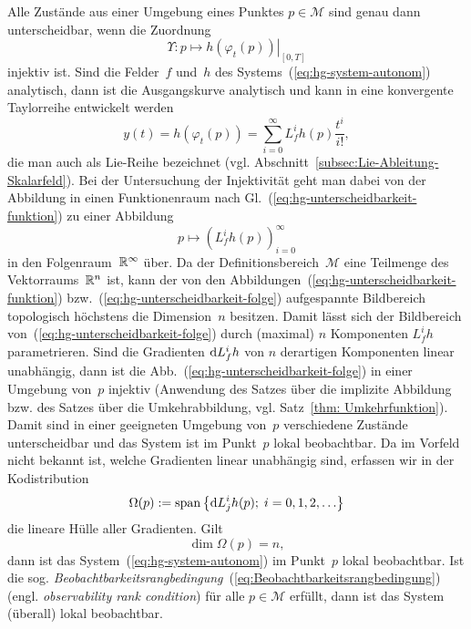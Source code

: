 Alle Zustände aus einer Umgebung eines Punktes $p\in\mathcal{M}$
sind genau dann unterscheidbar, wenn die Zuordnung 
\begin{equation}
\Upsilon:p\mapsto\left.h(\varphi_{t}(p))\right|_{[0,T]}\label{eq:hg-unterscheidbarkeit-funktion}
\end{equation}
injektiv ist. Sind die Felder~$f$ und~$h$
des Systems~(\ref{eq:hg-system-autonom}) analytisch, dann ist die
Ausgangskurve analytisch und kann in eine konvergente Taylorreihe
entwickelt werden
\[
y(t)=h(\varphi_{t}(p))=\sum_{i=0}^{\infty}L_{f}^{i}h(p)\frac{t^{i}}{i!},
\]
die man auch als Lie-Reihe bezeichnet (vgl. Abschnitt~\ref{subsec:Lie-Ableitung-Skalarfeld}).
Bei der Untersuchung der Injektivität geht man dabei von der Abbildung
in einen Funktionenraum nach Gl.~(\ref{eq:hg-unterscheidbarkeit-funktion})
zu einer Abbildung
\begin{equation}
p\mapsto\left(L_{f}^{i}h(p)\right)_{i=0}^{\infty}\label{eq:hg-unterscheidbarkeit-folge}
\end{equation}
in den Folgenraum~${\mathbb{R}}^{\infty}$ über. Da der Definitionsbereich~$\mathcal{M}$
eine Teilmenge des Vektorraums~${\mathbb{R}}^{n}$ ist, kann der von den Abbildungen~(\ref{eq:hg-unterscheidbarkeit-funktion})
bzw.~(\ref{eq:hg-unterscheidbarkeit-folge}) aufgespannte Bildbereich
topologisch höchstens die Dimension~$n$ besitzen. Damit lässt sich
der Bildbereich von~(\ref{eq:hg-unterscheidbarkeit-folge}) durch
(maximal) $n$ Komponenten $L_{f}^{i}h$ parametrieren. Sind die Gradienten
${\mathrm{d}} L_{f}^{i}h$ von $n$ derartigen Komponenten linear unabhängig,
dann ist die Abb.~(\ref{eq:hg-unterscheidbarkeit-folge}) in einer
Umgebung von~$p$ injektiv (Anwendung des Satzes über die implizite
Abbildung bzw. des Satzes über die Umkehrabbildung, vgl. Satz~\ref{thm: Umkehrfunktion}).
Damit sind in einer geeigneten Umgebung von~$p$ verschiedene Zustände
unterscheidbar und das System ist im Punkt~$p$ lokal beobachtbar.
Da im Vorfeld nicht bekannt ist, welche Gradienten linear unabhängig
sind, erfassen wir in der Kodistribution 
\begin{equation}
\Omega(p):={\operatorname{span}}\left\{ {\mathrm{d}} L_{j}^{i}h(p);\;i=0,1,2,\ldots\right\} \label{eq:Beobachtbarkeit-Kodistribution}
\end{equation}
die lineare Hülle aller Gradienten. Gilt
\begin{equation}
\dim\Omega(p)=n,\label{eq:Beobachtbarkeitsrangbedingung}
\end{equation}
dann ist das System~(\ref{eq:hg-system-autonom}) im Punkt~$p$
lokal beobachtbar. Ist die sog. \emph{Beobachtbarkeitsrangbedingung}~(\ref{eq:Beobachtbarkeitsrangbedingung})
(engl. \emph{observability rank condition}) für alle $p\in\mathcal{M}$
erfüllt, dann ist das System (überall) lokal beobachtbar. 

